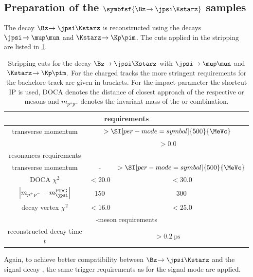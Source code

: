 \subsection[head={Preparation of the $\Bz\!\to\jpsi\Kstarz$ samples},tocentry={Preparation of the $\Bz\!\to\jpsi\Kstarz$ samples}]{Preparation of the $\symbfsf{\Bz\!\to\jpsi\Kstarz}$ samples}
\label{sec:PrepBd2JpsiKstSample}


The decay $\Bz\!\to\jpsi\Kstarz$ is reconstructed using the decays $\jpsi\!\to\mup\mun$ and $\Kstarz\!\to\Kp\pim$.
The cuts applied in the stripping are listed in \cref{tab:JpsiKstStripping}.
\begin{table}[tbp]
	\centering
	\caption{Stripping cuts for the decay $\Bz\!\to\jpsi\Kstarz$ with $\jpsi\!\to\mup\mun$ and $\Kstarz\!\to\Kp\pim$.
	For the charged tracks the more stringent requirements for the bachelore track are given in brackets.
	For the impact parameter the shortcut IP is used, DOCA denotes the distance of closest approach of the respective \Kstarz or \jpsi mesons and $m_{p^+p^-}$ denotes the invariant mass of the \mup\mun or \Kp\pim combination.}
	\begin{tabular}{ccc}
		\toprule
		\multicolumn{3}{c}{\muon requirements}\\
		\midrule
		transverse momentum \pt 	& \multicolumn{2}{c}{$>\SI[per-mode=symbol]{500}{\MeVc}$} \\
		\dllmupi					& \multicolumn{2}{c}{$>0.0$} \\
		\midrule
		resonances-requirements & \jpsi & \Kstarz\\
		\midrule
		transverse momentum \pt 							& - 								& $>\SI[per-mode=symbol]{500}{\MeVc}$ \\
		DOCA $\chi^2$										& $<20.0$ 							& $<30.0$ \\
		$\left|m_{p^+p^-}-m_{\jpsi}^{\text{PDG}}\right|$	& \SI[per-mode=symbol]{150}{\MeVcc} & \SI[per-mode=symbol]{300}{\MeVcc} \\
		decay vertex $\chi^2$ 								& $<16.0$ 							& $<25.0$ \\
		\midrule
		\multicolumn{3}{c}{\Bz-meson requirements}\\
		\midrule
		reconstructed decay time $t$ 	& \multicolumn{2}{c}{$>\SI{0.2}{\pico\second}$} \\
		\bottomrule
	\end{tabular}
	\label{tab:JpsiKstStripping}
\end{table}
Again, to achieve  better compatibility between $\Bz\!\to\jpsi\Kstarz$ and the signal decay \BdToDpi, the same trigger requirements as for the signal mode are applied.

